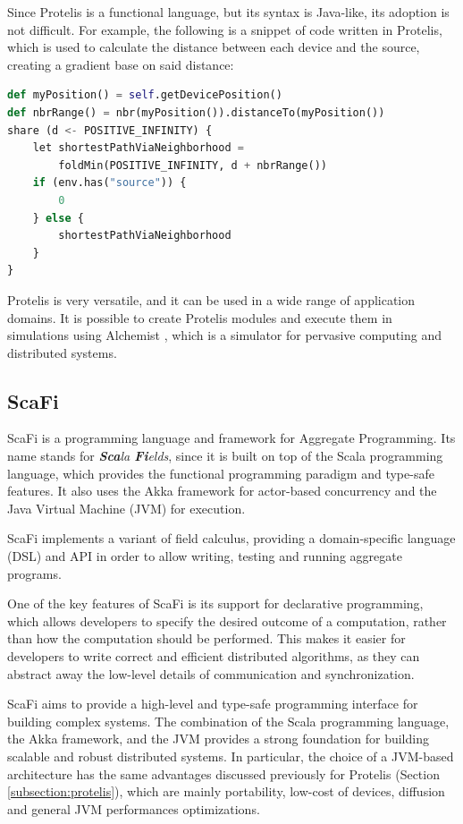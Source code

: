 Since Protelis is a functional language, but its syntax is Java-like, its adoption is not difficult. For example, the following is a snippet of code written in Protelis, which is used to calculate the distance between each device and the source, creating a gradient base on said distance:
\begin{lstlisting}[language=Python, caption=Protelis example, captionpos=b]
def myPosition() = self.getDevicePosition()
def nbrRange() = nbr(myPosition()).distanceTo(myPosition())
share (d <- POSITIVE_INFINITY) {
    let shortestPathViaNeighborhood = 
        foldMin(POSITIVE_INFINITY, d + nbrRange())
    if (env.has("source")) { 
        0 
    } else {
        shortestPathViaNeighborhood
    }
}
\end{lstlisting}

Protelis is very versatile, and it can be used in a wide range of application domains. It is possible to create Protelis modules and execute them in simulations using Alchemist \cite{alchemist}, which is a simulator for pervasive computing and distributed systems.

\subsection{ScaFi}\label{subsection:scafi}
ScaFi \cite{scafi_introduction} is a programming language and framework for Aggregate Programming. Its name stands for \textit{\textbf{Sca}la \textbf{Fi}elds}, since it is built on top of the Scala programming language, which provides the functional programming paradigm and type-safe features. It also uses the Akka framework for actor-based concurrency and the Java Virtual Machine (JVM) for execution.

ScaFi implements a variant of field calculus, providing a domain-specific language (DSL) and API in order to allow writing, testing and running aggregate programs.

One of the key features of ScaFi is its support for declarative programming, which allows developers to specify the desired outcome of a computation, rather than how the computation should be performed. This makes it easier for developers to write correct and efficient distributed algorithms, as they can abstract away the low-level details of communication and synchronization.

ScaFi aims to provide a high-level and type-safe programming interface for building complex systems.\newline
The combination of the Scala programming language, the Akka framework, and the JVM provides a strong foundation for building scalable and robust distributed systems.\newline
In particular, the choice of a JVM-based architecture has the same advantages discussed previously for Protelis (Section \ref{subsection:protelis}), which are mainly portability, low-cost of devices, diffusion and general JVM performances optimizations.

